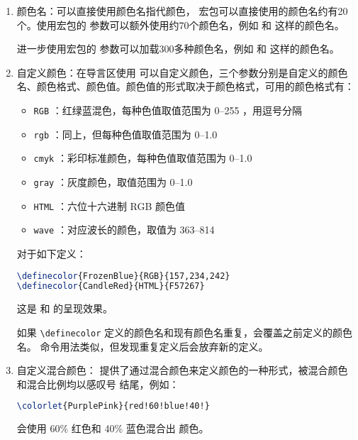 \begin{enumerate}
\item 颜色名：可以直接使用颜色名指代颜色， 宏包可以直接使用的颜色名约有20个。使用宏包的 \boxforcmd{[dvipsnames]} 参数可以额外使用约70个颜色名，例如 和 这样的颜色名。

进一步使用宏包的 \boxforcmd{[x11names]} 参数可以加载300多种颜色名，例如 和 这样的颜色名。

\item 自定义颜色：在导言区使用 \boxforcmd{\\definecolor{}{}{}} 可以自定义颜色，三个参数分别是自定义的颜色名、颜色格式、颜色值。颜色值的形式取决于颜色格式，可用的颜色格式有：

\begin{itemize}[itemsep=0pt]
    \item \verb|RGB| ：红绿蓝混色，每种色值取值范围为 0--255 ，用逗号分隔
    \item \verb|rgb| ：同上，但每种色值取值范围为 0--1.0
    \item \verb|cmyk| ：彩印标准颜色，每种色值取值范围为 0--1.0
    \item \verb|gray| ：灰度颜色，取值范围为 0--1.0
    \item \verb|HTML| ：六位十六进制 RGB 颜色值
    \item \verb|wave| ：对应波长的颜色，取值为 363--814 
\end{itemize}

对于如下定义：

\begin{tcolorbox}
\begin{lstlisting}[language=TeX]
\definecolor{FrozenBlue}{RGB}{157,234,242}
\definecolor{CandleRed}{HTML}{F57267}
\end{lstlisting}
\end{tcolorbox}

这是 和 的呈现效果。

如果 \verb|\definecolor| 定义的颜色名和现有颜色名重复，会覆盖之前定义的颜色名。\boxforcmd{\\providecolor} 命令用法类似，但发现重复定义后会放弃新的定义。

\item 自定义混合颜色： 提供了通过混合颜色来定义颜色的一种形式，被混合颜色和混合比例均以感叹号 \boxforcmd{!} 结尾，例如：

\begin{tcolorbox}
\begin{lstlisting}[language=TeX]
\colorlet{PurplePink}{red!60!blue!40!}
\end{lstlisting}
\end{tcolorbox}

会使用 60\% 红色和 40\% 蓝色混合出 颜色。

\end{enumerate}